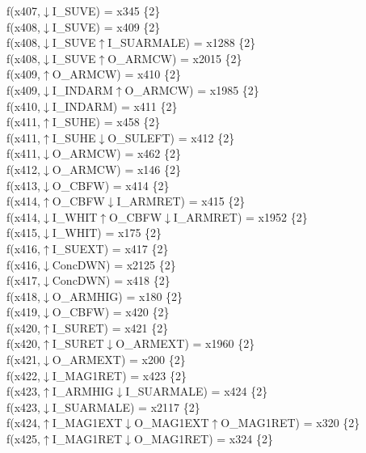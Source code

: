 f(x407,$\downarrow$I\_SUVE) = x345 \{2\} \\  
f(x408,$\downarrow$I\_SUVE) = x409 \{2\} \\  
f(x408,$\downarrow$I\_SUVE$\uparrow$I\_SUARMALE) = x1288 \{2\} \\  
f(x408,$\downarrow$I\_SUVE$\uparrow$O\_ARMCW) = x2015 \{2\} \\  
f(x409,$\uparrow$O\_ARMCW) = x410 \{2\} \\  
f(x409,$\downarrow$I\_INDARM$\uparrow$O\_ARMCW) = x1985 \{2\} \\  
f(x410,$\downarrow$I\_INDARM) = x411 \{2\} \\  
f(x411,$\uparrow$I\_SUHE) = x458 \{2\} \\  
f(x411,$\uparrow$I\_SUHE$\downarrow$O\_SULEFT) = x412 \{2\} \\  
f(x411,$\downarrow$O\_ARMCW) = x462 \{2\} \\  
f(x412,$\downarrow$O\_ARMCW) = x146 \{2\} \\  
f(x413,$\downarrow$O\_CBFW) = x414 \{2\} \\  
f(x414,$\uparrow$O\_CBFW$\downarrow$I\_ARMRET) = x415 \{2\} \\  
f(x414,$\downarrow$I\_WHIT$\uparrow$O\_CBFW$\downarrow$I\_ARMRET) = x1952 \{2\} \\  
f(x415,$\downarrow$I\_WHIT) = x175 \{2\} \\  
f(x416,$\uparrow$I\_SUEXT) = x417 \{2\} \\  
f(x416,$\downarrow$ConcDWN) = x2125 \{2\} \\  
f(x417,$\downarrow$ConcDWN) = x418 \{2\} \\  
f(x418,$\downarrow$O\_ARMHIG) = x180 \{2\} \\  
f(x419,$\downarrow$O\_CBFW) = x420 \{2\} \\  
f(x420,$\uparrow$I\_SURET) = x421 \{2\} \\  
f(x420,$\uparrow$I\_SURET$\downarrow$O\_ARMEXT) = x1960 \{2\} \\  
f(x421,$\downarrow$O\_ARMEXT) = x200 \{2\} \\  
f(x422,$\downarrow$I\_MAG1RET) = x423 \{2\} \\  
f(x423,$\uparrow$I\_ARMHIG$\downarrow$I\_SUARMALE) = x424 \{2\} \\  
f(x423,$\downarrow$I\_SUARMALE) = x2117 \{2\} \\  
f(x424,$\uparrow$I\_MAG1EXT$\downarrow$O\_MAG1EXT$\uparrow$O\_MAG1RET) = x320 \{2\} \\  
f(x425,$\uparrow$I\_MAG1RET$\downarrow$O\_MAG1RET) = x324 \{2\} \\  

